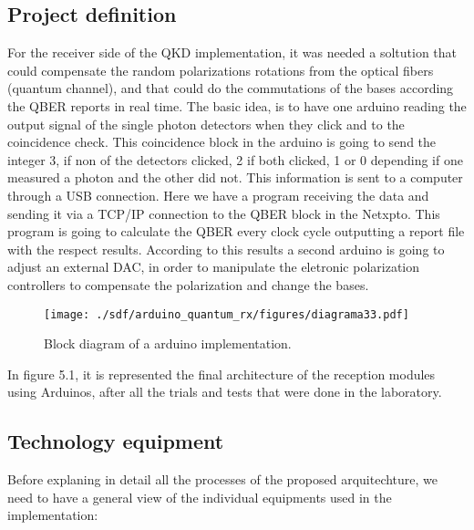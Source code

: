 \begin{refsection}
	\subsection{Project definition }
	For the receiver side of the QKD implementation, it was needed a soltution that could compensate the random polarizations rotations from the optical fibers (quantum channel), and that could do the commutations of the bases according the QBER reports in real time. The basic idea, is to have one arduino reading the output signal of the single photon detectors when they click and to the coincidence check. This coincidence block in the arduino is going to send the integer 3, if non of the detectors clicked, 2 if both clicked, 1 or 0 depending if one measured a photon and the other did not. This information is sent to a computer through a USB connection. Here we have a program receiving the data and sending it via a TCP/IP connection to the QBER block in the Netxpto. This program is going to calculate the QBER every clock cycle outputting a report file with the respect results. According to this results a second arduino is going to adjust an external DAC, in order to manipulate the eletronic polarization controllers to compensate the polarization and change the bases.

	
		\begin{figure}[H] 
		\centering
		\texttt{[image: ./sdf/arduino\_quantum\_rx/figures/diagrama33.pdf]}
		\caption{Block diagram of a arduino implementation.}
		\label{fig:netxpto}
		
	\end{figure}
	In figure 5.1, it is represented the final architecture  of the reception modules using Arduinos, after all the trials and tests that were done in the laboratory.
	
	\subsection{Technology equipment}
	Before explaning in detail all the processes of the proposed arquitechture, we need to have a general view of the individual equipments used in the implementation:
	
		

\end{refsection}
